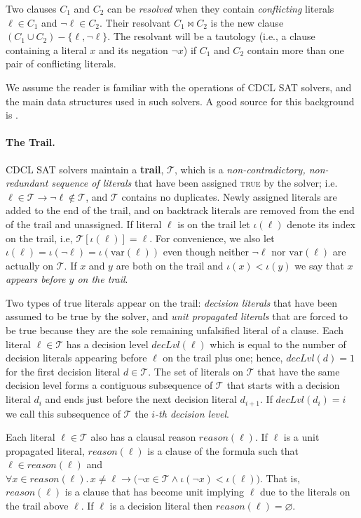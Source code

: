 \documentclass[runningheads]{llncs}
\newcommand{\sat}{SAT\xspace}
\newcommand{\trail}{\ensuremath{\mathcal{T}}}
\newcommand{\trailIdx}[1]{\ensuremath{\iota(#1)}}
\newcommand{\dlevel}[1]{\ensuremath{\mathit{decLvl}(#1)}}
\newcommand{\var}{\text{var}}
\newcommand{\true}{\textsc{true}\xspace}
\newcommand{\reason}[1]{\ensuremath{\mathit{reason}(#1)}}
\newcommand{\resolve}{\bowtie}
\renewcommand{\implies}{\rightarrow}
\begin{document}
Two clauses $C_1$ and $C_2$ can be \emph{resolved} when they contain
\emph{conflicting} literals $\ell\in C_1$ and $\lnot \ell \in
C_2$. Their resolvant $C_1 \resolve C_2$ is the new clause
$(C_1 \cup C_2) - \{\ell, \lnot \ell\}$. The resolvant will be a
tautology (i.e., a clause containing a literal $x$ and its negation
$\lnot x$) if $C_1$ and $C_2$ contain more than one pair of
conflicting literals.

We assume the reader is familiar with the operations of CDCL \sat
solvers, and the main data structures used in such solvers. A good
source for this background is \cite{DBLP:series/faia/SilvaLM09}.

\paragraph{The Trail.}
CDCL \sat solvers maintain a \textbf{trail}, $\trail$, which is a
\textit{non-contradictory, non-redundant sequence of literals} that
have been assigned \true by the solver; i.e.
$\ell\in\trail \implies \lnot\ell \not\in\trail$, and $\trail$
contains no duplicates. Newly assigned literals are added to the end
of the trail, and on backtrack literals are removed from the end of
the trail and unassigned.  If literal $\ell$ is on the trail let
$\trailIdx{\ell}$ denote its index on the trail, i.e,
$\trail[\trailIdx{\ell}] = \ell$. For convenience, we also let
$\trailIdx{\ell} = \trailIdx{\lnot \ell} = \trailIdx{\var(\ell)}$ even
though neither $\lnot \ell$ nor $\var(\ell)$ are actually on
$\trail$. If $x$ and $y$ are both on the trail and
$\trailIdx{x} < \trailIdx{y}$ we say that \textit{$x$ appears before
  $y$ on the trail}. 

Two types of true literals appear on the trail: \emph{decision
  literals} that have been assumed to be true by the solver, and
\emph{unit propagated literals} that are forced to be true because
they are the sole remaining unfalsified literal of a clause. Each
literal $\ell\in\trail$ has a decision level $\dlevel{\ell}$ which is
equal to the number of decision literals appearing before $\ell$ on
the trail plus one; hence, $\dlevel{d}=1$ for the first decision
literal $d\in\trail$.  The set of literals on $\trail$ that have the
same decision level forms a contiguous subsequence of $\trail$ that
starts with a decision literal $d_i$ and ends just before the next
decision literal $d_{i+1}$. If $\dlevel{d_i} = i$ we call this
subsequence of $\trail$ the \textit{$i$-th decision level}.

Each literal $\ell\in\trail$ also has a clausal reason
$\reason{\ell}$. If $\ell$ is a unit propagated literal,
$\reason{\ell}$ is a clause of the formula such that
$\ell \in \reason{\ell}$ and
$\forall x \in \reason{\ell}.\, x\neq \ell \implies \bigl(\lnot x \in
\trail \land \trailIdx{\lnot x} < \trailIdx{\ell}\bigr)$. That is,
$\reason{\ell}$ is a clause that has become unit implying $\ell$ due
to the literals on the trail above $\ell$. If $\ell$ is a decision
literal then $\reason{\ell} = \varnothing$.
\end{document}
